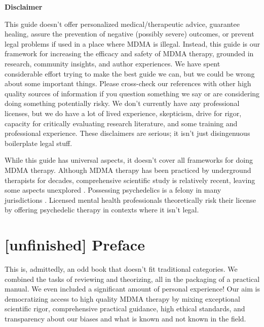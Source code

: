 \documentclass[12pt,letterpaper]{book}
\begin{document}
\newpage
\begin{center}
    \textbf{Disclaimer}

    \vspace{\baselineskip}

    This guide doesn't offer personalized medical/therapeutic advice, guarantee healing, assure the prevention of negative (possibly severe) outcomes, or prevent legal problems if used in a place where MDMA is illegal. Instead, this guide is our framework for increasing the efficacy and safety of MDMA therapy, grounded in research, community insights, and author experiences. We have spent considerable effort trying to make the best guide we can, but we could be wrong about some important things. Please cross-check our references with other high quality sources of information if you question something we say or are considering doing something potentially risky. We don't currently have any professional licenses, but we do have a lot of lived experience, skepticism, drive for rigor, capacity for critically evaluating research literature, and some training and professional experience. These disclaimers are serious; it isn't just disingenuous boilerplate legal stuff.

    \vspace{\baselineskip}

    While this guide has universal aspects, it doesn't cover all frameworks for doing MDMA therapy. Although MDMA therapy has been practiced by underground therapists for decades, comprehensive scientific study is relatively recent, leaving some aspects unexplored \cite{passieHistory}. Possessing psychedelics is a felony in many jurisdictions \cite{alphaLegalization}. Licensed mental health professionals theoretically risk their license by offering psychedelic therapy in contexts where it isn't legal.%
\end{center}
\clearpage

\tableofcontents

\chapter*{[unfinished] Preface}
This is, admittedly, an odd book that doesn't fit traditional categories. We combined the tasks of reviewing and theorizing, all in the packaging of a practical manual. We even included a significant amount of personal experience! Our aim is democratizing access to high quality MDMA therapy by mixing exceptional scientific rigor, comprehensive practical guidance, high ethical standards, and transparency about our biases and what is known and not known in the field.
\end{document}
